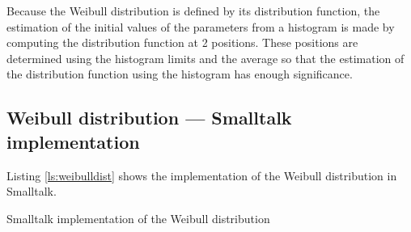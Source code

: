 \documentclass[twoside]{book}
\begin{document}
Because the Weibull distribution is defined by its distribution
function, the estimation of the initial values of the parameters
from a histogram is made by computing the distribution function at
2 positions. These positions are determined using the histogram
limits and the average so that the estimation of the distribution
function using the histogram has enough significance.

\subsection{Weibull distribution --- Smalltalk  implementation}
\label{sec:weibull} Listing \ref{ls:weibulldist} shows the
implementation of the Weibull distribution in Smalltalk.

\begin{listing} Smalltalk implementation of the Weibull distribution \label{ls:weibulldist}

\end{listing}



\ifx\wholebook\relax\else
\end{document}
